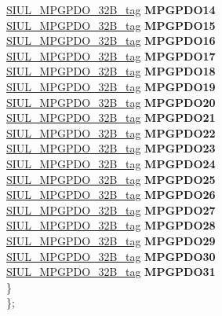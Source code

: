 \begin{DoxyCompactItemize}
\begin{tabbing}
\>\>\mbox{\hyperlink{unionSIUL__MPGPDO__32B__tag}{SIUL\_MPGPDO\_32B\_tag}} {\bfseries MPGPDO14}\\
\>\>\mbox{\hyperlink{unionSIUL__MPGPDO__32B__tag}{SIUL\_MPGPDO\_32B\_tag}} {\bfseries MPGPDO15}\\
\>\>\mbox{\hyperlink{unionSIUL__MPGPDO__32B__tag}{SIUL\_MPGPDO\_32B\_tag}} {\bfseries MPGPDO16}\\
\>\>\mbox{\hyperlink{unionSIUL__MPGPDO__32B__tag}{SIUL\_MPGPDO\_32B\_tag}} {\bfseries MPGPDO17}\\
\>\>\mbox{\hyperlink{unionSIUL__MPGPDO__32B__tag}{SIUL\_MPGPDO\_32B\_tag}} {\bfseries MPGPDO18}\\
\>\>\mbox{\hyperlink{unionSIUL__MPGPDO__32B__tag}{SIUL\_MPGPDO\_32B\_tag}} {\bfseries MPGPDO19}\\
\>\>\mbox{\hyperlink{unionSIUL__MPGPDO__32B__tag}{SIUL\_MPGPDO\_32B\_tag}} {\bfseries MPGPDO20}\\
\>\>\mbox{\hyperlink{unionSIUL__MPGPDO__32B__tag}{SIUL\_MPGPDO\_32B\_tag}} {\bfseries MPGPDO21}\\
\>\>\mbox{\hyperlink{unionSIUL__MPGPDO__32B__tag}{SIUL\_MPGPDO\_32B\_tag}} {\bfseries MPGPDO22}\\
\>\>\mbox{\hyperlink{unionSIUL__MPGPDO__32B__tag}{SIUL\_MPGPDO\_32B\_tag}} {\bfseries MPGPDO23}\\
\>\>\mbox{\hyperlink{unionSIUL__MPGPDO__32B__tag}{SIUL\_MPGPDO\_32B\_tag}} {\bfseries MPGPDO24}\\
\>\>\mbox{\hyperlink{unionSIUL__MPGPDO__32B__tag}{SIUL\_MPGPDO\_32B\_tag}} {\bfseries MPGPDO25}\\
\>\>\mbox{\hyperlink{unionSIUL__MPGPDO__32B__tag}{SIUL\_MPGPDO\_32B\_tag}} {\bfseries MPGPDO26}\\
\>\>\mbox{\hyperlink{unionSIUL__MPGPDO__32B__tag}{SIUL\_MPGPDO\_32B\_tag}} {\bfseries MPGPDO27}\\
\>\>\mbox{\hyperlink{unionSIUL__MPGPDO__32B__tag}{SIUL\_MPGPDO\_32B\_tag}} {\bfseries MPGPDO28}\\
\>\>\mbox{\hyperlink{unionSIUL__MPGPDO__32B__tag}{SIUL\_MPGPDO\_32B\_tag}} {\bfseries MPGPDO29}\\
\>\>\mbox{\hyperlink{unionSIUL__MPGPDO__32B__tag}{SIUL\_MPGPDO\_32B\_tag}} {\bfseries MPGPDO30}\\
\>\>\mbox{\hyperlink{unionSIUL__MPGPDO__32B__tag}{SIUL\_MPGPDO\_32B\_tag}} {\bfseries MPGPDO31}\\
\>\} \\
\}; \\


\end{tabbing}
\end{DoxyCompactItemize}
